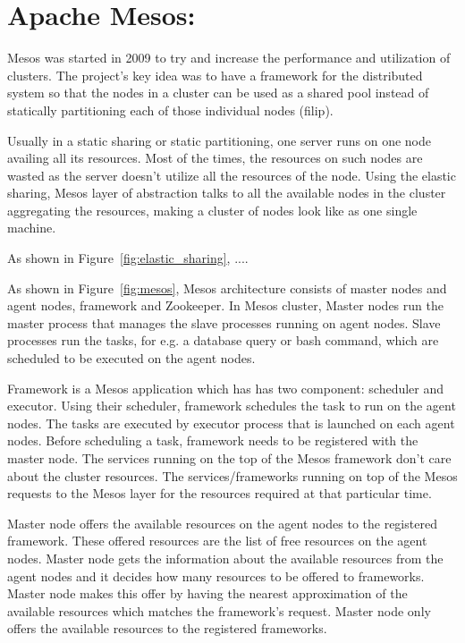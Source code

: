 \section{Apache Mesos:}
\label{sec:mesos}


Mesos was started in 2009 to try and increase the performance and utilization of clusters. The project's key idea was to have a framework for the distributed system so that  the nodes in a cluster can be used as a shared pool instead of statically partitioning each of those individual nodes (filip). 

Usually in a static sharing or static partitioning, one server runs on one node availing all its resources. Most of the times, the resources on such nodes are wasted as the server doesn't utilize all the resources of the node. Using the elastic sharing, Mesos layer of abstraction talks to all the available nodes in the cluster aggregating the resources, making a cluster of nodes look like as one single machine.

As shown in Figure~\ref{fig:elastic_sharing}, ....


As shown in Figure~\ref{fig:mesos}, Mesos architecture consists of master nodes and agent nodes, framework and Zookeeper. In Mesos cluster, Master nodes run the master process that manages the slave processes running on agent nodes. Slave processes run the tasks, for e.g. a database query or bash command, which are scheduled to be executed on the agent nodes. 

Framework is a Mesos application which has has two component: scheduler and executor. Using their scheduler, framework schedules the task to run on the agent nodes. The tasks are executed by executor process that is launched on each agent nodes. Before scheduling a task, framework needs to be registered with the master node. The services running on the top of the Mesos framework don't care about the cluster resources. The services/frameworks running on top of the Mesos requests to the Mesos layer for the resources required at that particular time.

Master node offers the available resources on the agent nodes to the registered framework. These offered resources are the list of free resources on the agent nodes. Master node gets the information about the available resources from the agent nodes and it decides how many resources to be offered to frameworks. Master node makes this offer by having the nearest approximation of the available resources which matches the framework's request. Master node only offers the available resources to the registered frameworks.
 
